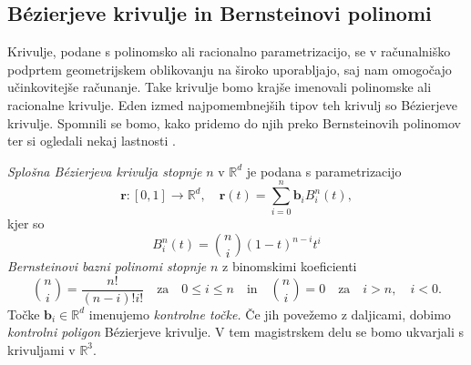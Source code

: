 \documentclass[12pt,a4paper,twoside]{article}
\theoremstyle{definition} %
\theoremstyle{plain} %
\theoremstyle{primerstyle}
\numberwithin{equation}{section}  %
\newcommand{\R}{\mathbb R}
\newcommand{\bV}{\mathbf{b}}
\newcommand{\rV}{\mathbf{r}}
\begin{document}
\subsection{Bézierjeve krivulje in Bernsteinovi polinomi}
\label{bern_poli_bez_kri_poglavje}
Krivulje, podane s polinomsko ali racionalno parametrizacijo, se v računalniško podprtem geometrijskem oblikovanju na široko uporabljajo, saj nam omogočajo učinkovitejše računanje. Take krivulje bomo krajše imenovali polinomske ali racionalne krivulje. Eden izmed najpomembnejših tipov teh krivulj so Bézierjeve krivulje. Spomnili se bomo, kako pridemo do njih preko Bernsteinovih polinomov ter si ogledali nekaj lastnosti \cite[str.\ 75]{farin2002handbook}.

\emph{Splošna Bézierjeva krivulja stopnje} $n$ v $\R^d$ je podana s parametrizacijo
\begin{equation}
	\label{splosna_bezier}
	\rV:[0,1]\rightarrow\R^d,\quad\rV(t)=\sum_{i=0}^n\bV_iB_i^n(t),
\end{equation}
kjer so
\begin{equation}
	\label{splosni_bernstein}
	B_i^n(t)=\binom{n}{i}(1-t)^{n-i}t^i
\end{equation}
\emph{Bernsteinovi bazni polinomi stopnje} $n$ z binomskimi koeficienti
$$\binom{n}{i}=\frac{n!}{(n-i)!i!}\quad\text{za}\quad 0\leq i \leq n\quad\text{in}\quad\binom{n}{i}=0\quad\text{za}\quad i>n,\quad i<0.$$
Točke $\bV_i\in\R^d$ imenujemo \emph{kontrolne točke.} Če jih povežemo z daljicami, dobimo \emph{kontrolni poligon} Bézierjeve krivulje. V tem magistrskem delu se bomo ukvarjali s krivuljami v $\R^3.$
\pagebreak
\end{document}
